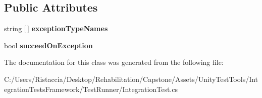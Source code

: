 \subsection*{Public Attributes}
\begin{DoxyCompactItemize}
\item 
\mbox{\label{class_integration_test_1_1_expect_exceptions_a8cb60d3db24721a7e1647bb0b9d6a7e8}} 
string \mbox{[}$\,$\mbox{]} {\bfseries exception\+Type\+Names}
\item 
\mbox{\label{class_integration_test_1_1_expect_exceptions_a5d4ef00e6cafebc71c9ab44dd51d7d61}} 
bool {\bfseries succeed\+On\+Exception}
\end{DoxyCompactItemize}


The documentation for this class was generated from the following file\+:\begin{DoxyCompactItemize}
\item 
C\+:/\+Users/\+Ristaccia/\+Desktop/\+Rehabilitation/\+Capstone/\+Assets/\+Unity\+Test\+Tools/\+Integration\+Tests\+Framework/\+Test\+Runner/Integration\+Test.\+cs\end{DoxyCompactItemize}
